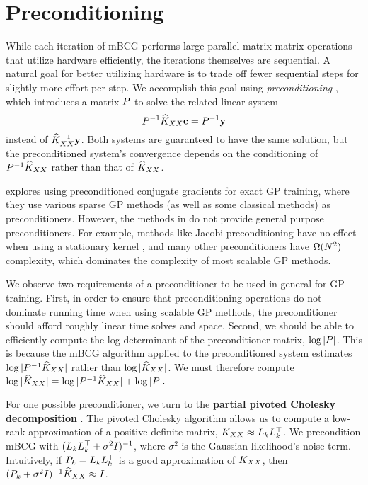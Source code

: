 \section{Preconditioning}
\label{sec:preconditioning}

While each iteration of mBCG performs large parallel matrix-matrix operations that utilize hardware efficiently, the iterations themselves are sequential.
A natural goal for better utilizing hardware is to trade off fewer sequential steps for slightly more effort per step.
We accomplish this goal using \emph{preconditioning} \cite{golub2012matrix,saad2003iterative,demmel1997applied,van2003iterative}, which introduces a matrix $P$ to solve the related linear system
\begin{equation*}
  P^{-1} \widehat{K}_{XX} \mathbf{c} = P^{-1}\mathbf{y}
\end{equation*}
instead of $\widehat{K}_{XX}^{-1} \mathbf{y}$.
Both systems are guaranteed to have the same solution, but the preconditioned system's convergence depends on the conditioning of $P^{-1}\widehat{K}_{XX}$ rather than that of $\widehat{K}_{XX}$.

\citet{cutajar2016preconditioning} explores using preconditioned conjugate gradients for exact GP training, where they use various sparse GP methods (as well as some classical methods) as preconditioners.
However, the methods in \citet{cutajar2016preconditioning} do not provide general purpose preconditioners.
For example, methods like Jacobi preconditioning have no effect when using a stationary kernel \cite{cutajar2016preconditioning,wilson2015thoughts}, and many other preconditioners have $\bigomega{N^{2}}$ complexity, which dominates the complexity of most scalable GP methods.

We observe two requirements of a preconditioner to be used in general for GP training.
First, in order to ensure that preconditioning operations do not dominate running time when using scalable GP methods, the preconditioner should afford roughly linear time solves and space.
Second, we should be able to efficiently compute the log determinant of the preconditioner matrix, $\log \vert P \vert$.
This is because the mBCG algorithm applied to the preconditioned system estimates $\log \vert P^{-1}\widehat{K}_{XX} \vert$ rather than $\log \vert \widehat{K}_{XX} \vert$. We must therefore compute
$
  \label{eq:logdet_adjusted}
  \log \vert \widehat{K}_{XX} \vert = \log \vert P^{-1}\widehat{K}_{XX} \vert + \log \vert P \vert.
$

For one possible preconditioner, we turn to the {\bf partial pivoted Cholesky decomposition} \cite{harbrecht2012low}.
The pivoted Cholesky algorithm allows us to compute a low-rank approximation of a positive definite matrix, $K_{XX} \approx L_{k} L_{k}^{\top}$.
We precondition mBCG with $(L_k L_k^\top + \sigma^2 I)^{-1}$, where $\sigma^2$ is the Gaussian likelihood's noise term.
Intuitively, if $P_{k}=L_{k}L_{k}^{\top}$ is a good approximation of $K_{XX}$, then $(P_{k} + \sigma^{2}I)^{-1}\widehat{K}_{XX} \approx I$.

